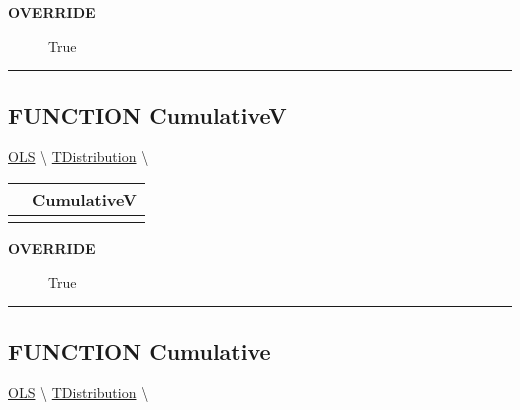 \par

\par
\begin{description}
\item [\colorbox{tagtype}{\color{white} \textbf{\textsf{OVERRIDE}}}] \textbf{\underline{}} True
\end{description}

\rule{\linewidth}{0.5pt}
\subsection*{\textsf{\colorbox{headtoc}{\color{white} FUNCTION}
CumulativeV}}

\hypertarget{ecldoc:linearregression.ols.tdistribution.cumulativev}{}
\hspace{0pt} \hyperlink{ecldoc:linearregression.ols}{OLS} \textbackslash 
\hspace{0pt} \hyperlink{ecldoc:linearregression.ols.tdistribution}{TDistribution} \textbackslash 

{\renewcommand{\arraystretch}{1.5}
\begin{tabularx}{\textwidth}{|>{\raggedright\arraybackslash}l|X|}
\hline
\hspace{0pt}\mytexttt{\color{red} } & \textbf{CumulativeV} \\
\hline
\multicolumn{2}{|>{\raggedright\arraybackslash}X|}{\hspace{0pt}\mytexttt{\color{param} ()}} \\
\hline
\end{tabularx}
}

\par

\par
\begin{description}
\item [\colorbox{tagtype}{\color{white} \textbf{\textsf{OVERRIDE}}}] \textbf{\underline{}} True
\end{description}

\rule{\linewidth}{0.5pt}
\subsection*{\textsf{\colorbox{headtoc}{\color{white} FUNCTION}
Cumulative}}

\hypertarget{ecldoc:linearregression.ols.tdistribution.cumulative}{}
\hspace{0pt} \hyperlink{ecldoc:linearregression.ols}{OLS} \textbackslash 
\hspace{0pt} \hyperlink{ecldoc:linearregression.ols.tdistribution}{TDistribution} \textbackslash 

